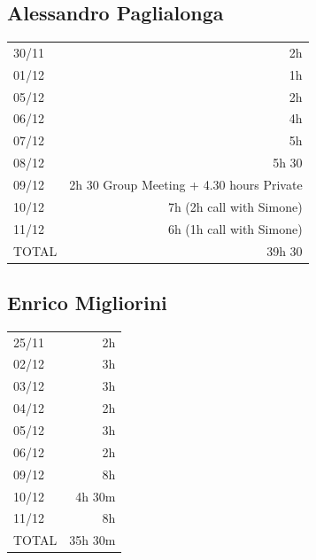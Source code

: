 \documentclass[12pt]{article}
\begin{document}
\subsection{Alessandro Paglialonga}
\begin{tabular}{l r}
30/11 & 2h\\
01/12 & 1h\\
05/12 & 2h\\
06/12 & 4h\\
07/12 & 5h\\
08/12 & 5h 30\\
09/12 & 2h 30 Group Meeting + 4.30 hours Private\\
10/12 & 7h (2h call with Simone)\\
11/12 & 6h (1h call with Simone)\\ \hline
TOTAL & 39h 30
\end{tabular}
\subsection{Enrico Migliorini}
\begin{tabular}{l r}
25/11 & 2h\\
02/12 & 3h\\
03/12 & 3h\\
04/12 & 2h\\
05/12 & 3h\\
06/12 & 2h\\
09/12 & 8h\\
10/12 & 4h 30m\\
11/12 & 8h\\ \hline
TOTAL & 35h 30m
\end{tabular}
\end{document}
